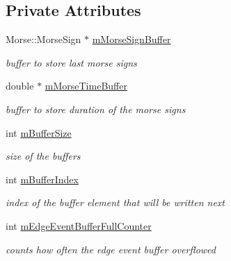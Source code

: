\subsection*{Private Attributes}
\begin{DoxyCompactItemize}
\item 
\mbox{\label{classMorseStatistic_ac778af78c64cc2a700e09dc78dc300a7}} 
Morse\+::\+Morse\+Sign $\ast$ \hyperlink{classMorseStatistic_ac778af78c64cc2a700e09dc78dc300a7}{m\+Morse\+Sign\+Buffer}
\begin{DoxyCompactList}\small\item\em buffer to store last morse signs \end{DoxyCompactList}\item 
\mbox{\label{classMorseStatistic_a376ed110e487f81bf51547e28c366d34}} 
double $\ast$ \hyperlink{classMorseStatistic_a376ed110e487f81bf51547e28c366d34}{m\+Morse\+Time\+Buffer}
\begin{DoxyCompactList}\small\item\em buffer to store duration of the morse signs \end{DoxyCompactList}\item 
\mbox{\label{classMorseStatistic_a1c05e54ba3bbdf68153cba828bfc019f}} 
int \hyperlink{classMorseStatistic_a1c05e54ba3bbdf68153cba828bfc019f}{m\+Buffer\+Size}
\begin{DoxyCompactList}\small\item\em size of the buffers \end{DoxyCompactList}\item 
\mbox{\label{classMorseStatistic_acf145c45629cca3568ec7d69c94ccce2}} 
int \hyperlink{classMorseStatistic_acf145c45629cca3568ec7d69c94ccce2}{m\+Buffer\+Index}
\begin{DoxyCompactList}\small\item\em index of the buffer element that will be written next \end{DoxyCompactList}\item 
\mbox{\label{classMorseStatistic_a60c80a05c589975e44063a02bbf9b933}} 
int \hyperlink{classMorseStatistic_a60c80a05c589975e44063a02bbf9b933}{m\+Edge\+Event\+Buffer\+Full\+Counter}
\begin{DoxyCompactList}\small\item\em counts how often the edge event buffer overflowed \end{DoxyCompactList}\end{DoxyCompactItemize}


